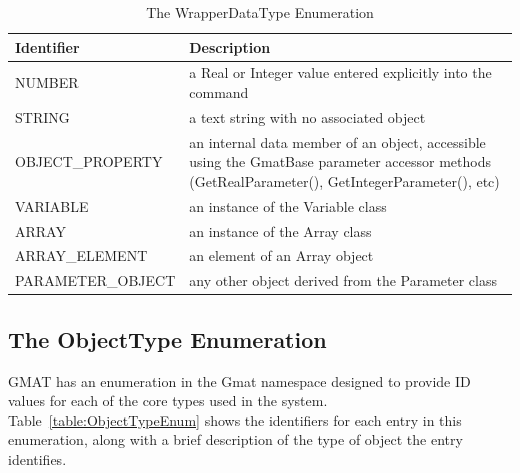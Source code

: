 \begin{table}[htb]
\begin{center}
\caption{\label{table:WrapperDataTypeEnum}The WrapperDataType Enumeration}
\setlength\extrarowheight{2pt}
\begin{tabular}{|p{1.7in}|p{4in}|}
\hline
Identifier & Description \\
\hline
\hline
NUMBER & a Real or Integer value entered explicitly into the command \\
STRING & a text string with no associated object \\
OBJECT\_PROPERTY & an internal data member of an object, accessible using the GmatBase
parameter accessor methods (GetRealParameter(), GetIntegerParameter(), etc) \\
VARIABLE & an instance of the Variable class \\
ARRAY & an instance of the Array class \\
ARRAY\_ELEMENT & an element of an Array object \\
PARAMETER\_OBJECT & any other object derived from the Parameter class \\
\hline
\end{tabular}
\end{center}
\end{table}


\subsection{The ObjectType Enumeration}

GMAT has an enumeration in the Gmat namespace designed to provide ID values for each of the core
types used in the system.  Table~\ref{table:ObjectTypeEnum} shows the identifiers for each entry in
this enumeration, along with a brief description of the type of object the entry identifies.


